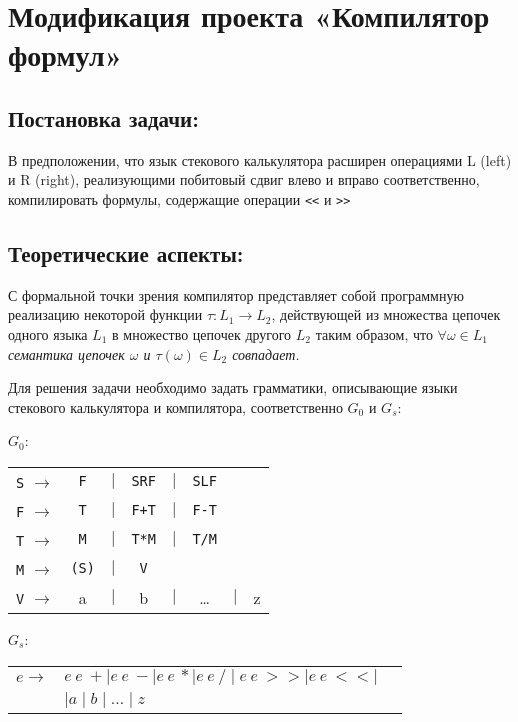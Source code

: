 
\section{Модификация проекта «Компилятор формул»}
\subsection{Постановка задачи:}
В предположении, что язык стекового калькулятора
расширен операциями L (left) и R (right),
реализующими побитовый сдвиг влево и вправо соответственно, компилировать
формулы, содержащие операции \verb|<<| и \verb|>>|

\subsection{Теоретические аспекты:}
С формальной точки зрения компилятор представляет собой программную реализацию
некоторой функции $\tau\colon L_1 \rightarrow L_2$, действующей из множества
цепочек одного языка $L_1$ в множество цепочек другого $L_2$ таким образом, что
$\forall \omega \in L_1$ {\em семантика цепочек $\omega$ и $\tau(\omega)\in L_2$
 совпадает.}

Для решения задачи необходимо задать грамматики, описывающие языки стекового
калькулятора и компилятора, соответственно $G_0$ и $G_s$:

$G_0$:
\medskip
\noindent\hspace{2cm}
\begin{tabular}{rcccccll}
\verb|S| $\rightarrow$ & \verb|F| &$\mid$& \verb|SRF|&$\mid$&\verb|SLF|\\
\verb|F| $\rightarrow$ & \verb|T| &$\mid$& \verb|F+T|&$\mid$&\verb|F-T|\\
\verb|T| $\rightarrow$ & \verb|M| &$\mid$& \verb|T*M|&$\mid$&\verb|T/M|\\
\verb|M| $\rightarrow$ & \verb|(S)|&$\mid$& \verb|V|\\
\verb|V| $\rightarrow$ & a &$\mid$& b &$\mid$& \dots &$\mid$& z\\
\end{tabular}
\medskip

$G_s$:
\medskip
\noindent\hspace{2cm}
\begin{tabular}{rll}
$e\rightarrow$ & $e~e~+ \mid e~e~-\mid e~e~* \mid e~e~/ \mid e~e~>>\mid e~e~<<\mid$\\
&$\mid a \mid b \mid \dots \mid z$
\end{tabular}


